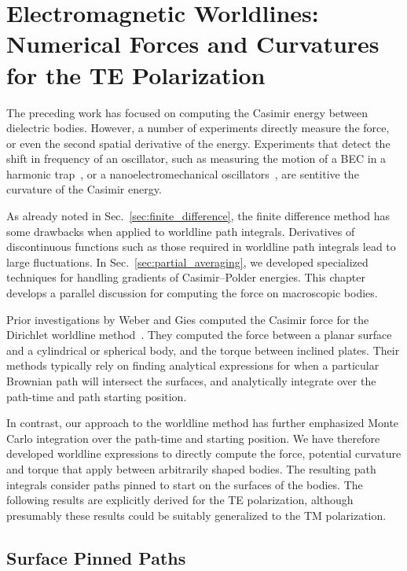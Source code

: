 \chapter{Electromagnetic Worldlines: Numerical Forces and Curvatures
for the TE Polarization}

The preceding work has focused on computing the Casimir energy between dielectric bodies.  However,
a number of experiments directly measure the force, or even the second spatial derivative of the energy.
Experiments that detect the shift in frequency of an oscillator, such as 
measuring the motion of a BEC in a harmonic trap~\cite{Harber2005,Obrecht2007}, or  
a nanoelectromechanical oscillators~\cite{Chan2001}, are sentitive the curvature of the Casimir energy.

As already noted in Sec.~\ref{sec:finite_difference}, the finite difference method has some drawbacks
when applied to worldline path integrals.  
Derivatives of discontinuous functions such as those required in worldline path integrals lead to large fluctuations.
In Sec.~\ref{sec:partial_averaging}, we developed specialized techniques for handling gradients of Casimir--Polder 
energies.  This chapter develops a parallel discussion for computing the force on macroscopic bodies.  

Prior investigations by Weber and Gies computed the Casimir force for
the Dirichlet worldline method~\cite{Weber2009, Weber2010}.
They computed the force between a planar surface and a cylindrical or spherical body, and the
torque between inclined plates.  Their methods typically rely on finding analytical expressions for 
when a particular Brownian path will intersect the surfaces, and analytically integrate over 
the path-time and path starting position.  

In contrast, our approach to the worldline method has further emphasized Monte Carlo integration over
the path-time and starting position.  
We have therefore developed worldline expressions to directly compute the force, potential curvature
and torque that apply between arbitrarily shaped bodies.  The resulting path integrals consider 
paths pinned to start on the surfaces of the bodies.  
The following results are explicitly derived for
the TE polarization, although presumably these results could be suitably generalized to the TM polarization.  

\section{Surface Pinned Paths}
\label{sec:path-pinning}

